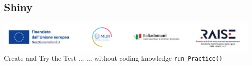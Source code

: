 \documentclass{beamer}
\begin{document}
\subsection{Shiny}
\begin{frame}{\includegraphics[scale=0.4]{Da_cambiare.png} \\ 
Create and Try the Test ... }{... without coding 
 knowledge \texttt{run\_Practice()}}
\end{frame}
\end{document}
